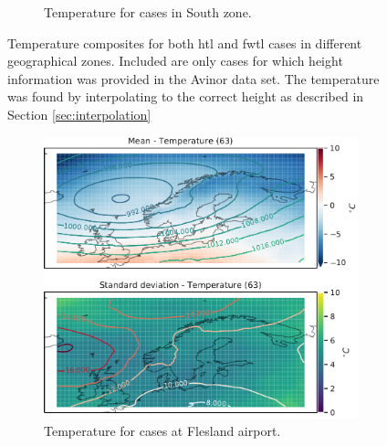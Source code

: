 \begin{figure}
\begin{subfigure}[b]{0.49\textwidth}
    \caption{Temperature for cases in South zone.}
    \label{fig:SouthTemperature}
\end{subfigure}
\caption{Temperature composites for both \acrshort{htl} and \acrshort{fwtl} cases in different geographical zones. Included are only cases for which height information was provided in the Avinor data set. The temperature was found by interpolating to the correct height as described in Section \ref{sec:interpolation}}
\label{fig:tempzones}
\end{figure}

\begin{figure}
     \centering
     \begin{subfigure}[b]{0.49\textwidth}
         \centering
         \includegraphics[width=\textwidth]{Figures/TempENBR.pdf}
         \caption{Temperature for cases at Flesland airport.}
         \label{fig:ENBRTemperature}
     \end{subfigure}
     \hfill
     \begin{subfigure}[b]{0.49\textwidth}
         \centering

\end{subfigure}
\end{figure}
